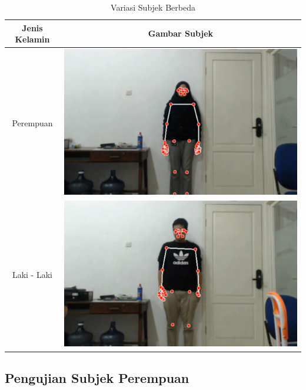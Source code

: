 \newpage
\begin{longtable}{|c|c|}
  \caption{Variasi Subjek Berbeda}
  \label{tb:kondisisubjek}                                   \\
  \hline
  \rowcolor[HTML]{C0C0C0}
  \textbf{Jenis Kelamin} & \textbf{Gambar Subjek}  \\
  \hline
  Perempuan            &  \includegraphics[scale=0.3]{gambar/bab4-rani.png}                \\
  \hline
  Laki - Laki            & \includegraphics[scale=0.3]{gambar/bab4-evan.png}                 \\
  \hline
\end{longtable}

\newpage
\subsection{Pengujian Subjek Perempuan}
\label{sec:analisisperempuan}


